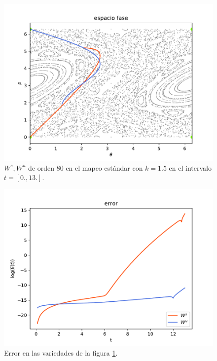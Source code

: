 \begin{figure}[H]
\centering
\includegraphics[scale=0.7]{k15}
\caption{$W^{s},W^{u}$ de orden $80$ en el mapeo estándar con $k=1.5$ en el intervalo $t=[0.,13.].$}
\label{estandar15}
\end{figure}

\begin{figure}[H]
\centering
\includegraphics[scale=0.7]{errork15} 
\caption{Error en las variedades de la figura \ref{estandar15}.}
\label{error est k15}
\end{figure}




